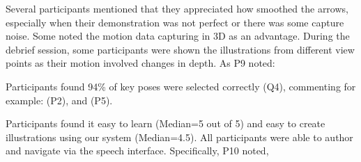 %
Several participants mentioned that they appreciated how \systemname{} smoothed the arrows, especially when their demonstration was not perfect or there was some capture noise.
%
Some noted the motion data capturing in 3D as an advantage.
During the debrief session, some participants were shown the illustrations from different view points as their motion involved changes in depth. As P9 noted: 

Participants found 94\% of key poses were selected correctly (Q4), commenting for example:
 (P2), and
 (P5).
%

Participants found it easy to learn \systemname{} (Median=5 out of 5) and easy to create illustrations using our system (Median=4.5).
%
All participants were able to author and navigate via the speech interface.
Specifically, P10 noted, 

